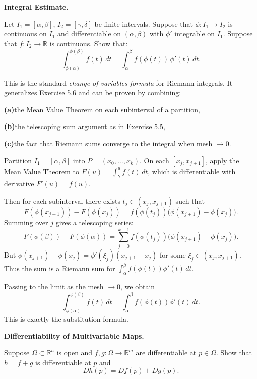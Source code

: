 \begin{problem}[CP-II-0171]
\label{prob:cp-ii-0171}
\textbf{Integral Estimate.}

\hspace*{1.5em}Let $I_1=[\alpha,\beta]$, $I_2=[\gamma,\delta]$ be finite intervals. Suppose that
$\phi:I_1\to I_2$ is continuous on $I_1$ and differentiable on $(\alpha,\beta)$ with
$\phi'$ integrable on $I_1$. Suppose that $f:I_2\to\mathbb{R}$ is continuous.
Show that:
\[
\int_{\phi(\alpha)}^{\phi(\beta)} f(t)\,dt = \int_\alpha^\beta f(\phi(t))\,\phi'(t)\,dt.
\]

This is the standard \emph{change of variables formula} for Riemann integrals.
It generalizes Exercise 5.6 and can be proven by combining:

	\par\smallskip\noindent\textbf{(a)}\quad the Mean Value Theorem on each subinterval of a partition,
	\par\smallskip\noindent\textbf{(b)}\quad the telescoping sum argument as in Exercise 5.5,
	\par\smallskip\noindent\textbf{(c)}\quad the fact that Riemann sums converge to the integral when mesh $\to 0$.
\end{problem}

\begin{solution}
Partition $I_1=[\alpha,\beta]$ into $P=(x_0,\ldots,x_k)$. On each $[x_j,x_{j+1}]$, apply the Mean Value Theorem to $F(u)=\int_\gamma^u f(t)\,dt$, which is differentiable with derivative $F'(u)=f(u)$.

	Then for each subinterval there exists $t_j\in(x_j,x_{j+1})$ such that
	\[
	F(\phi(x_{j+1}))-F(\phi(x_j)) = f(\phi(t_j))\big(\phi(x_{j+1})-\phi(x_j)\big).
	\]
	Summing over $j$ gives a telescoping series:
	\[
	F(\phi(\beta))-F(\phi(\alpha)) = \sum_{j=0}^{k-1} f(\phi(t_j))\big(\phi(x_{j+1})-\phi(x_j)\big).
	\]
	But $\phi(x_{j+1})-\phi(x_j)=\phi'(\xi_j)(x_{j+1}-x_j)$ for some $\xi_j\in(x_j,x_{j+1})$.
	Thus the sum is a Riemann sum for $\int_\alpha^\beta f(\phi(t))\phi'(t)\,dt$.

	Passing to the limit as the mesh $\to 0$, we obtain
	\[
	\int_{\phi(\alpha)}^{\phi(\beta)} f(t)\,dt = \int_\alpha^\beta f(\phi(t))\phi'(t)\,dt.
	\]
	This is exactly the substitution formula.
\end{solution}

\begin{problem}[CP-II-0172]
\label{prob:cp-ii-0172}
\textbf{Differentiability of Multivariable Maps.}

\hspace*{1.5em}Suppose $\Omega\subset\mathbb{R}^n$ is open and $f,g:\Omega\to\mathbb{R}^m$ are differentiable at $p\in\Omega$.
Show that $h=f+g$ is differentiable at $p$ and
\[
Dh(p)=Df(p)+Dg(p).
\]
\end{problem}

